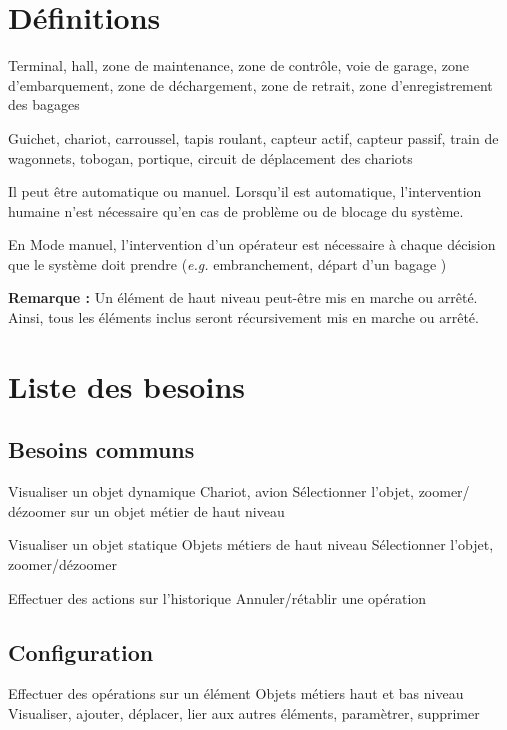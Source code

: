 \section{Définitions}
{Terminal, hall,  zone de maintenance, zone de contrôle, voie de garage, zone d'embarquement, zone de déchargement, zone de retrait, zone d'enregistrement des bagages}


{Guichet, chariot, carroussel, tapis roulant, capteur actif, capteur passif,  train de wagonnets, tobogan, portique, circuit de déplacement des chariots}


{
Il peut être automatique ou manuel. Lorsqu'il est automatique, l'intervention humaine n'est nécessaire qu'en cas de problème ou de blocage du système.

En Mode manuel, l'intervention d'un opérateur est nécessaire à chaque décision que le système doit prendre (\textsl{e.g.} embranchement, départ d'un bagage )
}

\textbf{Remarque :} Un élément de haut niveau peut-être mis en marche ou arrêté. Ainsi, tous les éléments inclus seront récursivement mis en marche ou arrêté.

\section{Liste des besoins}
\subsection{Besoins communs}
\nBesoin
{Visualiser un objet dynamique}
{Chariot, avion}
{Sélectionner l'objet, zoomer/ dézoomer sur un objet métier de haut niveau}

\nBesoin
{Visualiser un objet statique}
{Objets métiers de haut niveau}
{Sélectionner l'objet, zoomer/dézoomer}

\nBesoin
{Effectuer des actions sur l'historique}
{}
{Annuler/rétablir une opération}

\subsection{Configuration}
\setcounter{cntBesoins}{1}

\nBesoin
{Effectuer des opérations sur un élément}
{Objets métiers haut et bas niveau}
{Visualiser, ajouter, déplacer, lier aux autres éléments, paramètrer, supprimer}

